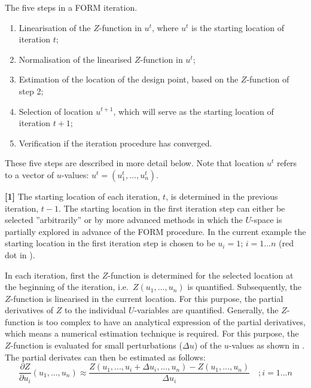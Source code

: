 The five steps in a FORM iteration.
\begin{enumerate}
\item Linearisation of the $Z$-function in $u^t$, where $u^t$ is the starting location of iteration $t$;

\item Normalisation of the linearised $Z$-function in $u^t$;

\item Estimation of the location of the design point, based on the $Z$-function of step 2;

\item Selection of location $u^{t+1}$, which will serve as the starting location of iteration $t+1$;

\item Verification if the iteration procedure has converged.
\end{enumerate}

These five steps are described in more detail below. Note that location $u^t$ refers to a vector of $u$-values: $u^t = (u_1^t,\dots ,u_n^t)$.

\textbf{[1]} The starting location of each iteration, $t$, is determined in the previous iteration, $t-1$.
The starting location in the first iteration step can either be selected ''arbitrarily'' or by more advanced methods in which the $U$-space is partially explored in advance of the FORM procedure.
In the current example the starting location in the first iteration step is chosen to be $u_i=1$; $i=1...n$ (red dot in ).

In each iteration, first the $Z$-function is determined for the selected location at the beginning of the iteration, i.e.\ $Z(u_1,\dots ,u_n)$ is quantified. Subsequently, the $Z$-function is linearised in the current location. For this purpose, the partial derivatives of $Z$ to the individual $U$-variables are quantified. Generally, the $Z$-function is too complex to have an analytical expression of the partial derivatives, which means a numerical estimation technique is required. For this purpose, the $Z$-function is evaluated for small perturbations ($\Delta u$) of the $u$-values as shown in . The partial derivates can then be estimated as follows:
\begin{equation}
\frac{\partial Z}{\partial u_{i} } \left(u_{1} ,...,u_{n} \right)\approx \frac{Z\left(u_{1} ,...,u_{i} +\Delta u_{i} ,...,u_{n} \right)-Z\left(u_{1} ,...,u_{n} \right)}{\Delta u_{i} } \quad ;i=1...n \label{eq:2-50} 
\end{equation}

